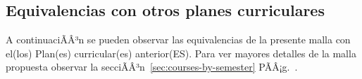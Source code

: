 \begin{landscape}
\chapter{Equivalencias con otros planes curriculares}\label{chap:equivalence}
A continuaciÃÂ³n se pueden observar las equivalencias de la presente malla con el(los) Plan(es) curricular(es) anterior(ES). 
Para ver mayores detalles de la malla propuesta observar la secciÃÂ³n~\ref{sec:courses-by-semester} PÃÂ¡g.~\pageref{sec:courses-by-semester}.


\end{landscape}

